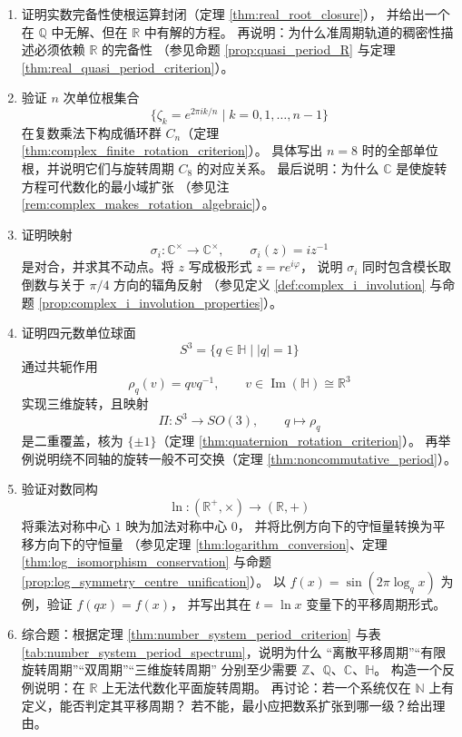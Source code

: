 \begin{enumerate}[leftmargin=3em, label=\textbf{题 \arabic*}]
    \item 证明实数完备性使根运算封闭（定理 \ref{thm:real_root_closure}），
    并给出一个在 $\mathbb{Q}$ 中无解、但在 $\mathbb{R}$ 中有解的方程。
    再说明：为什么准周期轨道的稠密性描述必须依赖 $\mathbb{R}$ 的完备性
    （参见命题 \ref{prop:quasi_period_R} 与定理 \ref{thm:real_quasi_period_criterion}）。

    \item 验证 $n$ 次单位根集合
    \[
    \{\zeta_k=e^{2\pi ik/n}\mid k=0,1,\dots,n-1\}
    \]
    在复数乘法下构成循环群 $C_n$（定理 \ref{thm:complex_finite_rotation_criterion}）。
    具体写出 $n=8$ 时的全部单位根，并说明它们与旋转周期 $C_8$ 的对应关系。
    最后说明：为什么 $\mathbb{C}$ 是使旋转方程可代数化的最小域扩张
    （参见注 \ref{rem:complex_makes_rotation_algebraic}）。

    \item 证明映射
    \[
    \sigma_i:\mathbb{C}^{\times}\to\mathbb{C}^{\times},\qquad
    \sigma_i(z)=iz^{-1}
    \]
    是对合，并求其不动点。将 $z$ 写成极形式 $z=re^{i\varphi}$，
    说明 $\sigma_i$ 同时包含模长取倒数与关于 $\pi/4$ 方向的辐角反射
    （参见定义 \ref{def:complex_i_involution} 与命题 \ref{prop:complex_i_involution_properties}）。

    \item 证明四元数单位球面
    \[
    S^3=\{q\in\mathbb{H}\mid |q|=1\}
    \]
    通过共轭作用
    \[
    \rho_q(v)=qvq^{-1},\qquad v\in\operatorname{Im}(\mathbb{H})\cong\mathbb{R}^3
    \]
    实现三维旋转，且映射
    \[
    \Pi:S^3\to SO(3),\qquad q\mapsto\rho_q
    \]
    是二重覆盖，核为 $\{\pm1\}$（定理 \ref{thm:quaternion_rotation_criterion}）。
    再举例说明绕不同轴的旋转一般不可交换（定理 \ref{thm:noncommutative_period}）。

    \item 验证对数同构
    \[
    \ln:(\mathbb{R}^+,\times)\to(\mathbb{R},+)
    \]
    将乘法对称中心 $1$ 映为加法对称中心 $0$，
    并将比例方向下的守恒量转换为平移方向下的守恒量
    （参见定理 \ref{thm:logarithm_conversion}、定理 \ref{thm:log_isomorphism_conservation}
    与命题 \ref{prop:log_symmetry_centre_unification}）。
    以 $f(x)=\sin(2\pi\log_q x)$ 为例，验证 $f(qx)=f(x)$，
    并写出其在 $t=\ln x$ 变量下的平移周期形式。

    \item 综合题：根据定理 \ref{thm:number_system_period_criterion}
    与表 \ref{tab:number_system_period_spectrum}，说明为什么
    “离散平移周期”“有限旋转周期”“双周期”“三维旋转周期”
    分别至少需要 $\mathbb{Z}$、$\mathbb{Q}$、$\mathbb{C}$、$\mathbb{H}$。
    构造一个反例说明：在 $\mathbb{R}$ 上无法代数化平面旋转周期。
    再讨论：若一个系统仅在 $\mathbb{N}$ 上有定义，能否判定其平移周期？
    若不能，最小应把数系扩张到哪一级？给出理由。


\end{enumerate}
